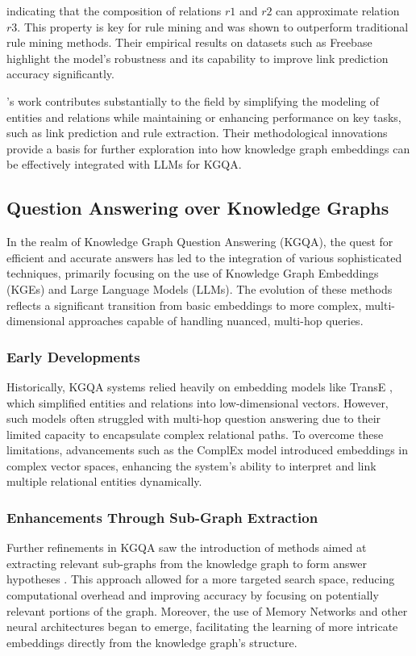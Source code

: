 \documentclass{article}
\begin{document}
indicating that the composition of relations $r1$ and $r2$ can approximate relation $r3$. This property is key for rule mining and was shown to outperform traditional rule mining methods. Their empirical results on datasets such as Freebase highlight the model's robustness and its capability to improve link prediction accuracy significantly.

\textcite{yang2015embedding}'s work contributes substantially to the field by simplifying the modeling of entities and relations while maintaining or enhancing performance on key tasks, such as link prediction and rule extraction. Their methodological innovations provide a basis for further exploration into how knowledge graph embeddings can be effectively integrated with LLMs for KGQA.

\subsection{Question Answering over Knowledge Graphs}
In the realm of Knowledge Graph Question Answering (KGQA), the quest for efficient and accurate answers has led to the integration of various sophisticated techniques, primarily focusing on the use of Knowledge Graph Embeddings (KGEs) and Large Language Models (LLMs). The evolution of these methods reflects a significant transition from basic embeddings to more complex, multi-dimensional approaches capable of handling nuanced, multi-hop queries.

\subsubsection{Early Developments}
Historically, KGQA systems relied heavily on embedding models like TransE \textcite{bordes2013translating}, which simplified entities and relations into low-dimensional vectors. However, such models often struggled with multi-hop question answering due to their limited capacity to encapsulate complex relational paths. To overcome these limitations, advancements such as the ComplEx model \textcite{trouillon2016complex} introduced embeddings in complex vector spaces, enhancing the system's ability to interpret and link multiple relational entities dynamically.

\subsubsection{Enhancements Through Sub-Graph Extraction}
Further refinements in KGQA saw the introduction of methods aimed at extracting relevant sub-graphs from the knowledge graph to form answer hypotheses \parencite{yih2015semantic, bao2016constraint}. This approach allowed for a more targeted search space, reducing computational overhead and improving accuracy by focusing on potentially relevant portions of the graph. Moreover, the use of Memory Networks and other neural architectures began to emerge, facilitating the learning of more intricate embeddings directly from the knowledge graph's structure.
\end{document}

